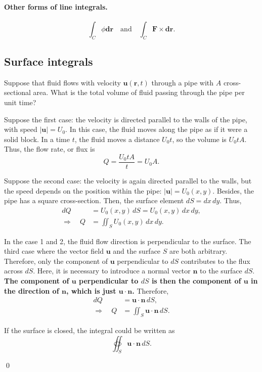 \paragraph{Other forms of line integrals. }
\begin{equation}
    \int_C \phi \bm{dr}
    \quad \mathrm{and} \quad
    \int_C \bm{F} \times \bm{dr}. 
\end{equation}

\subsection{Surface integrals}
\begin{example}
    Suppose that fluid flows with velocity $\bm{u}(\bm{r},t)$ through a pipe with $A$ cross-sectional area. 
    What is the total volume of fluid passing through the pipe per unit time?
    
    Suppose the first case: the velocity is directed parallel to the walls of the pipe, with speed $|\bm{u}| = U_0$. 
    In this case, the fluid moves along the pipe as if it were a solid block. 
    In a time $t$, the fluid moves a distance $U_0 t$, so the volume is $U_0 t A$. 
    Thus, the flow rate, or flux is 
    \begin{equation}
        Q = \frac{U_0 t A}{t} = U_0 A.  
    \end{equation}

    Suppose the second case: the velocity is again directed parallel to the walls, but the speed depends on the position within the pipe: 
    $|\bm{u}| = U_0 (x,y)$.
    Besides, the pipe has a square cross-section. 
    Then, the surface element $dS = dx \, dy$. 
    Thus, 
    \begin{align}
        dQ &= U_0(x,y) \, dS = U_0(x,y) \, dx\,dy, \\
        \Longrightarrow \quad
        Q &= \iint_S U_0(x,y) \, dx\,dy. 
    \end{align}

    In the case 1 and 2, the fluid flow direction is perpendicular to the surface. 
    The third case where the vector field $\bm{u}$ and the surface $S$ are both arbitrary. 
    Therefore, only the component of $\bm{u}$ perpendicular to $dS$ contributes to the flux across $dS$.
    Here, it is necessary to introduce a normal vector $\bm{n}$ to the surface $dS$.
    \textbf{The component of $\bm{u}$ perpendicular to $dS$ is then the component of $\bm{u}$ in the direction of $\bm{n}$, which is just $\bm{u} \cdot \bm{n}$.} 
    Therefore, 
    \begin{align}
        dQ &= \bm{u} \cdot \bm{n} \, dS, \\
        \Longrightarrow \quad
        Q &= \iint_S \bm{u} \cdot \bm{n} \, dS. 
    \end{align}

    If the surface is closed, the integral could be written as 
    \begin{equation}
        \oiint_S \bm{u} \cdot \bm{n} \, dS.
    \end{equation}

    \qed 
\end{example}

